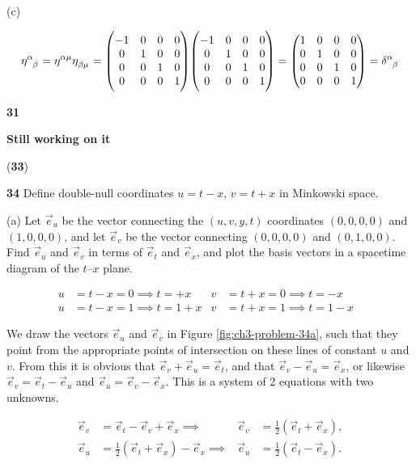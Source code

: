 \documentclass[gr-notes.tex]{subfiles}
\begin{document}
(c)

\begin{displaymath}
  \tensor{\eta}{^\alpha_\beta} =
  \tensor{\eta}{^{\alpha\mu}} \tensor{\eta}{_{\beta\mu}} =
  \mqty(\dmat[0]{-1,1,1,1}) \mqty(\dmat[0]{-1,1,1,1}) =
  \mqty(\imat{4}) =
  \tensor{\delta}{^\alpha_\beta}
\end{displaymath}





\textbf{31}

\textbf{Still working on it}



(\textbf{33})


\textbf{34}
Define double-null coordinates $u = t-x$, $v = t + x$ in Minkowski space.

(a)
Let $\vec{e}_u$ be the vector connecting the $(u,v,y,t)$ coordinates $(0,0,0,0)$ and $(1,0,0,0)$, and let $\vec{e}_v$ be the vector connecting $(0,0,0,0)$ and $(0,1,0,0)$. Find $\vec{e}_u$ and $\vec{e}_v$ in terms of $\vec{e}_t$ and $\vec{e}_x$, and plot the basis vectors in a spacetime diagram of the $t$--$x$ plane.

\begin{align*}
  u &= t - x = 0 \implies t =  +x &
  v &= t + x = 0 \implies t =  -x
  \\
  u &= t - x = 1 \implies t = 1+x &
  v &= t + x = 1 \implies t = 1-x &
\end{align*}

We draw the vectors $\vec{e}_u$ and $\vec{e}_v$ in Figure \ref{fig:ch3-problem-34a}, such that they point from the appropriate points of intersection on these lines of constant $u$ and $v$. From this it is obvious that $\vec{e}_v + \vec{e}_u = \vec{e}_t$, and that $\vec{e}_v - \vec{e}_u = \vec{e}_x$, or likewise $\vec{e}_v = \vec{e}_t - \vec{e}_u$ and $\vec{e}_u = \vec{e}_v - \vec{e}_x$. This is a system of 2 equations with two unknowns.

\begin{align*}
  \vec{e}_v &=
  \vec{e}_t - \vec{e}_v + \vec{e}_x \implies &
  \vec{e}_v &=
  \frac{1}{2} (\vec{e}_t + \vec{e}_x),
  \\
  \vec{e}_u &=
  \frac{1}{2} (\vec{e}_t + \vec{e}_x) - \vec{e}_x \implies &
  \vec{e}_u &=
  \frac{1}{2} (\vec{e}_t - \vec{e}_x).
\end{align*}
\end{document}
